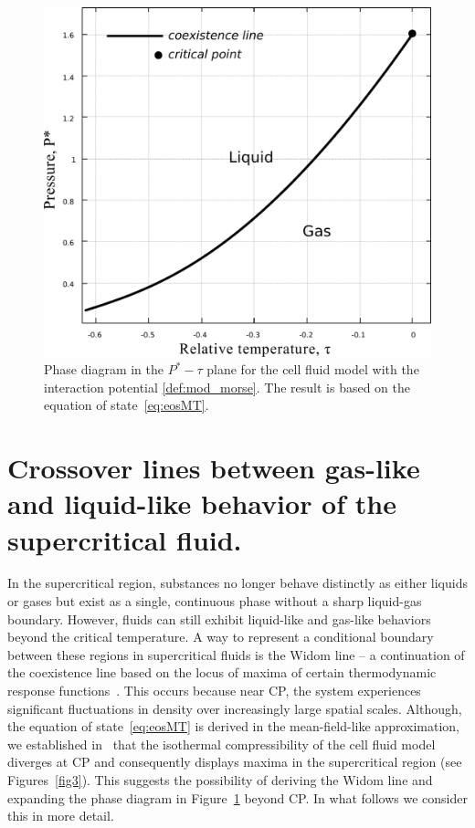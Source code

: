 \begin{figure}[t!]
	\centering
	\includegraphics[width=\column]{f2.pdf} 
	\vskip-3mm\caption{Phase diagram in the $P^*-\tau$ plane for the cell fluid model with the interaction potential \eqref{def:mod_morse}. The result is based on the equation of state~\eqref{eq:eosMT}. 
	}\label{fig2}
\end{figure}



\section{\label{sec:widom} Crossover lines between gas-like and liquid-like behavior of the supercritical fluid.}

In the supercritical region, substances no longer behave distinctly as either liquids or gases but exist as a single, continuous phase without a sharp liquid-gas boundary. However, fluids can still exhibit liquid-like and gas-like behaviors beyond the critical temperature. A way to represent a conditional boundary between these regions in supercritical fluids is the Widom line \--- a continuation of the coexistence line based on the locus of maxima of certain thermodynamic response functions~\cite{XKBetal05,MS10,SBGetal10}. This occurs because near CP, the system experiences significant fluctuations in density over increasingly large spatial scales. Although, the equation of state~\eqref{eq:eosMT} is derived in the mean-field-like approximation, we established in~\cite{DKRP24arxiv,DKRP24} that the isothermal compressibility of the cell fluid model diverges at CP and consequently displays maxima in the supercritical region (see Figures~\ref{fig3}). This suggests the possibility of deriving the Widom line and expanding the phase diagram in Figure~\ref{fig2} beyond CP.
In what follows we consider this in more detail.

